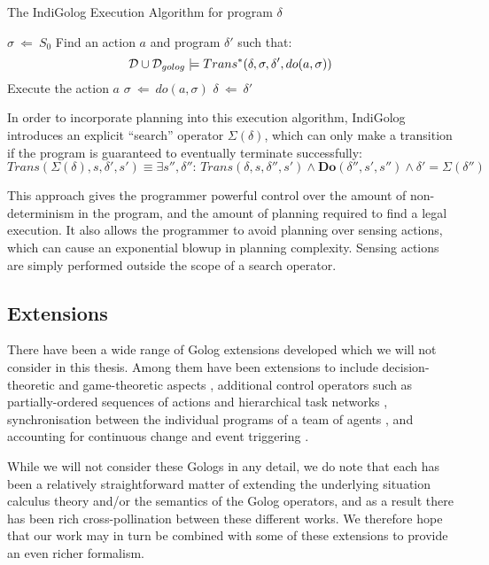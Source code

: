 %
\begin{algorithm}[t]
\caption{The IndiGolog Execution Algorithm for program $\delta$}


\label{alg:indigolog_exec} \begin{algorithmic} \STATE $\sigma\ \Leftarrow\ S_{0}$
 \STATE
Find an action $a$ and program $\delta'$ such that: \[
\mathcal{D}\cup\mathcal{D}_{golog}\models Trans^{*}(\delta,\sigma,\delta',do(a,\sigma))\]
 \STATE Execute the action $a$ \STATE $\sigma\ \Leftarrow\ do(a,\sigma)$
\STATE $\delta\ \Leftarrow\ \delta'$ \ENDWHILE \end{algorithmic} 
\end{algorithm}


In order to incorporate planning into this execution algorithm, IndiGolog
introduces an explicit {}``search'' operator $\Sigma(\delta)$,
which can only make a transition if the program is guaranteed to eventually
terminate successfully:\[
Trans(\Sigma(\delta),s,\delta',s')\equiv\exists s'',\delta'':\, Trans(\delta,s,\delta'',s')\wedge\mathbf{Do}(\delta'',s',s'')\wedge\delta'=\Sigma(\delta'')\]


This approach gives the programmer powerful control over the amount
of non-determinism in the program, and the amount of planning required
to find a legal execution. It also allows the programmer to avoid
planning over sensing actions, which can cause an exponential blowup
in planning complexity. Sensing actions are simply performed outside
the scope of a search operator.


\subsection{Extensions}

There have been a wide range of Golog extensions developed which we
will not consider in this thesis. Among them have been extensions
to include decision-theoretic \citep{boutilier00dtgolog} and game-theoretic
aspects \citep{finzi03gtgolog,finzi05pogtgolog}, additional control
operators such as partially-ordered sequences of actions \citep{son00htn_golog}
and hierarchical task networks \citep{Gabaldon02htn_in_golog,Son04golog+htn+time},
synchronisation between the individual programs of a team of agents
\citep{farinelli07team_golog}, and accounting for continuous change
and event triggering \citep{grosskreutz00ccgolog}.

While we will not consider these Gologs in any detail, we do note
that each has been a relatively straightforward matter of extending
the underlying situation calculus theory and/or the semantics of the
Golog operators, and as a result there has been rich cross-pollination
between these different works. We therefore hope that our work may
in turn be combined with some of these extensions to provide an even
richer formalism.


